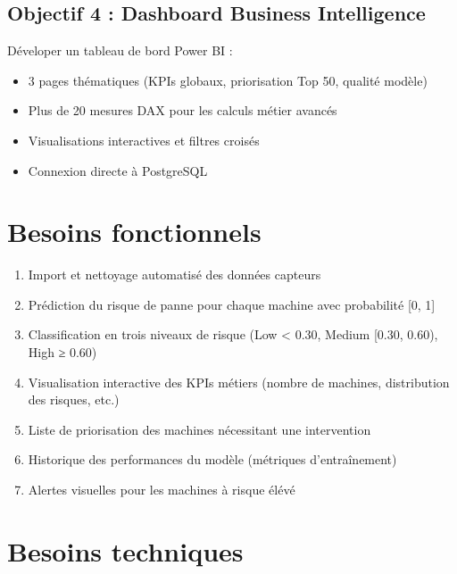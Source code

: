 \documentclass[a4paper,12pt,twoside]{report}
\begin{document}
\subsection{Objectif 4 : Dashboard Business Intelligence}

Déveloper un tableau de bord Power BI :
\begin{itemize}
    \item 3 pages thématiques (KPIs globaux, priorisation Top 50, qualité modèle)
    \item Plus de 20 mesures DAX pour les calculs métier avancés
    \item Visualisations interactives et filtres croisés
    \item Connexion directe à PostgreSQL
\end{itemize}

\section{Besoins fonctionnels}

\begin{enumerate}
    \item Import et nettoyage automatisé des données capteurs
    \item Prédiction du risque de panne pour chaque machine avec probabilité [0, 1]
    \item Classification en trois niveaux de risque (Low < 0.30, Medium [0.30, 0.60), High ≥ 0.60)
    \item Visualisation interactive des KPIs métiers (nombre de machines, distribution des risques, etc.)
    \item Liste de priorisation des machines nécessitant une intervention
    \item Historique des performances du modèle (métriques d'entraînement)
    \item Alertes visuelles pour les machines à risque élévé
\end{enumerate}

\section{Besoins techniques}
\end{document}
